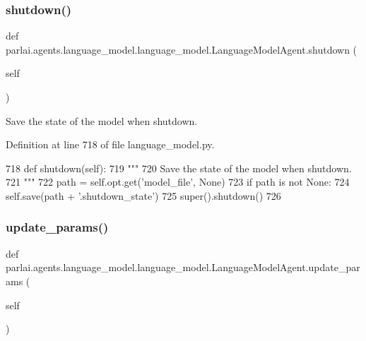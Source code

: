 \subsubsection{\texorpdfstring{shutdown()}{shutdown()}}
{\footnotesize\ttfamily def parlai.\+agents.\+language\+\_\+model.\+language\+\_\+model.\+Language\+Model\+Agent.\+shutdown (\begin{DoxyParamCaption}\item[{}]{self }\end{DoxyParamCaption})}

\begin{DoxyVerb}Save the state of the model when shutdown.
\end{DoxyVerb}
 

Definition at line 718 of file language\+\_\+model.\+py.


\begin{DoxyCode}
718     \textcolor{keyword}{def }shutdown(self):
719         \textcolor{stringliteral}{"""}
720 \textcolor{stringliteral}{        Save the state of the model when shutdown.}
721 \textcolor{stringliteral}{        """}
722         path = self.opt.get(\textcolor{stringliteral}{'model\_file'}, \textcolor{keywordtype}{None})
723         \textcolor{keywordflow}{if} path \textcolor{keywordflow}{is} \textcolor{keywordflow}{not} \textcolor{keywordtype}{None}:
724             self.save(path + \textcolor{stringliteral}{'.shutdown\_state'})
725         super().shutdown()
726 
\end{DoxyCode}
\mbox{\label{classparlai_1_1agents_1_1language__model_1_1language__model_1_1LanguageModelAgent_af474c46339e2e0c881f8b8b81f5f9b7f}} 
\subsubsection{\texorpdfstring{update\+\_\+params()}{update\_params()}}
{\footnotesize\ttfamily def parlai.\+agents.\+language\+\_\+model.\+language\+\_\+model.\+Language\+Model\+Agent.\+update\+\_\+params (\begin{DoxyParamCaption}\item[{}]{self }\end{DoxyParamCaption})}

